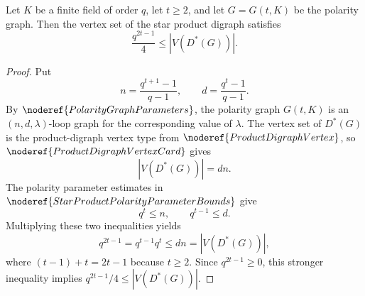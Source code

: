 \begin{helper}
Let \(K\) be a finite field of order \(q\), let \(t\ge2\), and let
\(G=G(t,K)\) be the polarity graph.  Then the vertex set of the star product
digraph satisfies
\[
  \frac{q^{2t-1}}4 \le |V(D^*(G))|.
\]
\end{helper}
\begin{proof}
Put
\[
  n=\frac{q^{t+1}-1}{q-1},\qquad
  d=\frac{q^t-1}{q-1}.
\]
By \(\noderef{PolarityGraphParameters}\), the polarity graph \(G(t,K)\) is an
\((n,d,\lambda)\)-loop graph for the corresponding value of \(\lambda\).  The
vertex set of \(D^*(G)\) is the product-digraph vertex type from
\(\noderef{ProductDigraphVertex}\), so \(\noderef{ProductDigraphVertexCard}\)
gives
\[
  |V(D^*(G))|=dn.
\]
The polarity parameter estimates in
\(\noderef{StarProductPolarityParameterBounds}\) give
\[
  q^t\le n,\qquad q^{t-1}\le d.
\]
Multiplying these two inequalities yields
\[
  q^{2t-1}=q^{t-1}q^t\le dn=|V(D^*(G))|,
\]
where \((t-1)+t=2t-1\) because \(t\ge2\).  Since \(q^{2t-1}\ge0\), this
stronger inequality implies \(q^{2t-1}/4\le |V(D^*(G))|\).
\end{proof}
